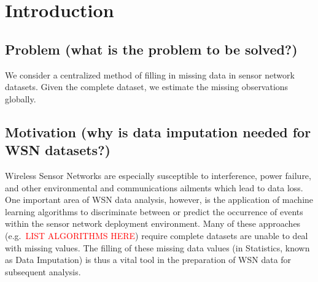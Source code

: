 \documentclass[10pt]{sensys11}
\newcommand{\redtext}[1]{\textcolor{red}{#1}}
\begin{document}

\section{Introduction}

\subsection{Problem (what is the problem to be solved?)}
We consider a centralized method of filling in missing data in sensor network datasets.
Given the complete dataset, we estimate the missing observations globally.


\subsection{Motivation (why is data imputation needed for WSN datasets?)}
Wireless Sensor Networks are especially susceptible to interference, power failure, and other environmental and communications ailments which lead to data loss.
One important area of WSN data analysis, however, is the application of machine learning algorithms to discriminate between or predict the occurrence of events within the sensor network deployment environment.
Many of these approaches (e.g.\ \redtext{LIST ALGORITHMS HERE}) require complete datasets are unable to deal with missing values. The filling of these missing data values (in Statistics, known as Data Imputation) is thus a vital tool in the preparation of WSN data for subsequent analysis. 
\end{document}
